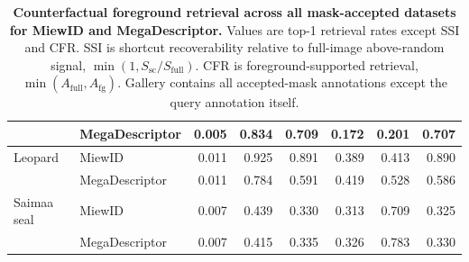 \begin{table}[!t]
\begin{tabular}[t]{@{}llrrrrrr@{}}
 & MegaDescriptor & 0.005 & 0.834 & 0.709 & 0.172 & 0.201 & 0.707 \\
\midrule
Leopard & MiewID & 0.011 & 0.925 & 0.891 & 0.389 & 0.413 & 0.890 \\
 & MegaDescriptor & 0.011 & 0.784 & 0.591 & 0.419 & 0.528 & 0.586 \\
\midrule
Saimaa seal & MiewID & 0.007 & 0.439 & 0.330 & 0.313 & 0.709 & 0.325 \\
 & MegaDescriptor & 0.007 & 0.415 & 0.335 & 0.326 & 0.783 & 0.330 \\
\bottomrule
\end{tabular}
\caption{\textbf{Counterfactual foreground retrieval across all mask-accepted datasets for MiewID and MegaDescriptor.} Values are top-1 retrieval rates except SSI and CFR. SSI is shortcut recoverability relative to full-image above-random signal, $\min(1,S_{\mathrm{sc}}/S_{\mathrm{full}})$. CFR is foreground-supported retrieval, $\min(A_{\mathrm{full}},A_{\mathrm{fg}})$. Gallery contains all accepted-mask annotations except the query annotation itself.}
\label{tab:all-cfr-miewid-megad}
\end{table}
